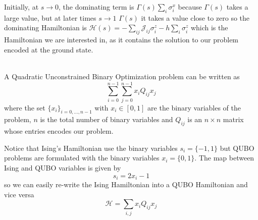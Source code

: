 Initially, at $s \rightarrow 0$, the dominating term is $\Gamma(s)\sum_{i}\sigma_{i}^{x}$ because $\Gamma(s)$ takes a large value, but at later times $s \rightarrow 1$ $\Gamma(s)$ it takes a value close to zero so the dominating Hamiltonian is $\mathcal{H}(s) = -\sum_{ij}\mathcal{J}_{ij}\sigma_{i}^{z} - h\sum_{i}\sigma_{i}^{z}$ which is the Hamiltonian we are interested in, as it contains the solution to our problem encoded at the ground state.\\\\
\begin{definition}
   A Quadratic Unconstrained Binary Optimization problem can be written as
\begin{equation}
    \sum_{i=0}^{n-1}\sum_{j=0}^{n-1}x_{i}Q_{ij}x_{j}
\end{equation}
where the set $\{x_{i}\}_{i=0,\hdots, n-1}$ with $x_{i}\in\left[0,1\right]$ are the binary variables of the problem, $n$ is the total number of binary variables and $Q_{ij}$ is an $n\times n$ matrix whose entries encodes our problem.
\end{definition}
Notice that Ising's Hamiltonian use the binary variables $s_{i} = \{-1,1\}$ but QUBO problems are formulated with the binary variables $x_{i} = \{0,1\}$. The map between Ising and QUBO variables is given by
\begin{equation}
    s_{i} = 2x_{i} -1
\end{equation}
so we can easily re-write the Ising Hamiltonian into a QUBO Hamiltonian and vice versa
\begin{equation}
    \mathcal{H} = \sum_{i,j}x_{i}Q_{ij}x_{j}
\end{equation}
